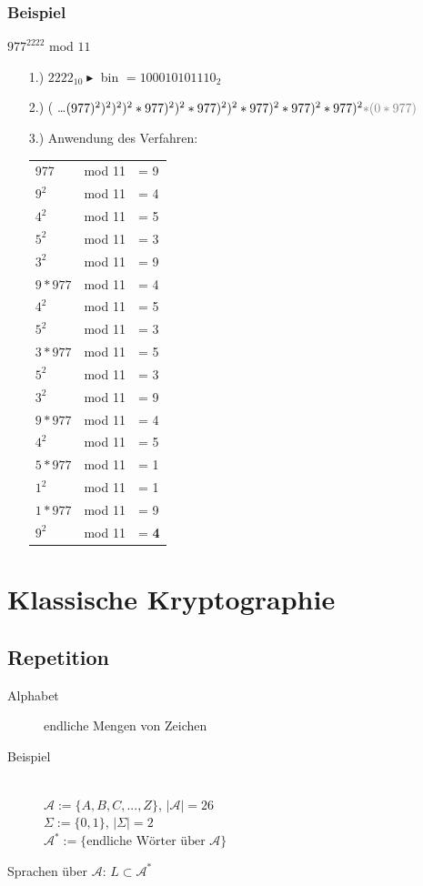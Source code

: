 \documentclass[landscape,twocolumn,a4paper]{article}
\newcommand{\Pota}{\mathcal{A}}
\newcommand{\T}[1]{\text{#1}} %
\begin{document}
\subsubsection{Beispiel}
$977^{2222}$ mod $11$
\begin{itemize}
	\item[1.)] $2222_{10} \blacktriangleright$ bin $= 100010101110_2$
	\item[2.)] ( \dots $ (977)^2)^2)^2)^2*977)^2)^2*977)^2)^2*977)^2*977)^2*977)^2 {\color{gray} *(0*977)}$
	\item[3.)] Anwendung des Verfahren: \\
	\begin{tabular}{l l l}
	 977 & mod 11 & = 9 \\
	 $9^2$ & mod 11 & = 4 \\
	 $4^2$ & mod 11 & = 5 \\
	 $5^2$ & mod 11 & = 3 \\
	 $3^2$ & mod 11 & = 9 \\
	 $9*977$ & mod 11 & = 4\\
	 $4^2$ & mod 11 & = 5\\
	 $5^2$ & mod 11 & = 3\\
	 $3*977$ & mod 11 & = 5\\
	 $5^2$ & mod 11 & = 3\\
	 $3^2$ & mod 11 & = 9\\
	 $9*977$ & mod 11 & = 4\\
	 $4^2$ & mod 11 & = 5\\
	 $5*977$ & mod 11 & = 1\\
	 $1^2$ & mod 11 & = 1\\
	 $1*977$ & mod 11 & = 9\\
	 $9^2$ & mod 11 & = \textbf{4}
	\end{tabular}
\end{itemize}
\section{Klassische Kryptographie}
\setcounter{subsection}{-1}
\subsection{Repetition}
\begin{description}
	\item[Alphabet] endliche Mengen von Zeichen
	\item[Beispiel] \hfill \\
		$\Pota := \{A,B,C, ..., Z\}$, $|\Pota|=26$ \\
		$\Sigma := \{0,1\}$, $|\Sigma|=2$\\
		$\Pota ^*:=\{\T{endliche Wörter über }\Pota\}$
\end{description}
Sprachen über $\Pota$: $L\subset\Pota ^*$
\end{document}
